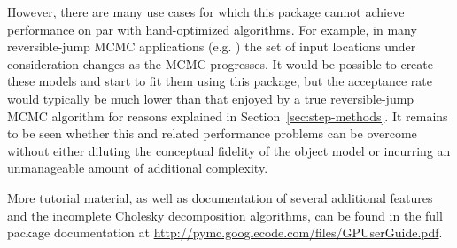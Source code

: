 \documentclass[article]{jss}
\begin{document}
However, there are many use cases for which this package cannot achieve performance on par with hand-optimized algorithms. For example, in many reversible-jump MCMC applications (e.g. \cite{gramacy}) the set of input locations under consideration changes as the MCMC progresses. It would be possible to create these models and start to fit them using this package, but the acceptance rate would typically be much lower than that enjoyed by a true reversible-jump MCMC algorithm for reasons explained in Section~\ref{sec:step-methods}. It remains to be seen whether this and related performance problems can be overcome without either diluting the conceptual fidelity of the object model or incurring an unmanageable amount of additional complexity.

More tutorial material, as well as documentation of several additional features and the incomplete Cholesky decomposition algorithms, can be found in the full package documentation at \href{http://pymc.googlecode.com/files/GPUserGuide.pdf}{http://pymc.googlecode.com/files/GPUserGuide.pdf}.


\end{document}
